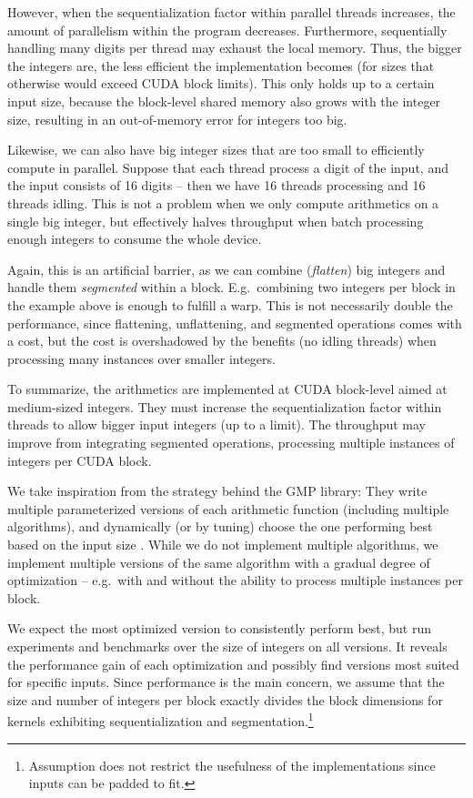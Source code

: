 However, when the sequentialization factor within parallel threads increases,
the amount of parallelism within the program decreases. Furthermore,
sequentially handling many digits per thread may exhaust the local memory. Thus,
the bigger the integers are, the less efficient the implementation becomes (for
sizes that otherwise would exceed CUDA block limits). This only holds up to a
certain input size, because the block-level shared memory also grows with the
integer size, resulting in an out-of-memory error for integers too big.

Likewise, we can also have big integer sizes that are too small to efficiently
compute in parallel. Suppose that each thread process a digit of the input, and
the input consists of 16 digits -- then we have 16 threads processing and 16
threads idling. This is not a problem when we only compute arithmetics on a
single big integer, but effectively halves throughput when batch processing
enough integers to consume the whole device.

Again, this is an artificial barrier, as we can combine (\textit{flatten}) big
integers and handle them \textit{segmented} within a block. E.g.\ combining two
integers per block in the example above is enough to fulfill a warp. This is not
necessarily double the performance, since flattening, unflattening, and
segmented operations comes with a cost, but the cost is overshadowed by the
benefits (no idling threads) when processing many instances over smaller
integers. \bigskip

To summarize, the arithmetics are implemented at CUDA block-level aimed at
medium-sized integers. They must increase the sequentialization factor within
threads to allow bigger input integers (up to a limit). The throughput may
improve from integrating segmented operations, processing multiple instances of
integers per CUDA block.

We take inspiration from the strategy behind the GMP library: They write
multiple parameterized versions of each arithmetic function (including multiple
algorithms), and dynamically (or by tuning) choose the one performing best based
on the input size \cite{GMP}. While we do not implement multiple algorithms, we
implement multiple versions of the same algorithm with a gradual degree of
optimization -- e.g.\ with and without the ability to process multiple instances
per block.

We expect the most optimized version to consistently perform best, but run
experiments and benchmarks over the size of integers on all versions. It reveals
the performance gain of each optimization and possibly find versions most suited
for specific inputs. Since performance is the main concern, we assume that the
size and number of integers per block exactly divides the block dimensions for
kernels exhibiting sequentialization and segmentation.\footnote{Assumption does
  not restrict the usefulness of the implementations since inputs can be padded
  to fit.}

